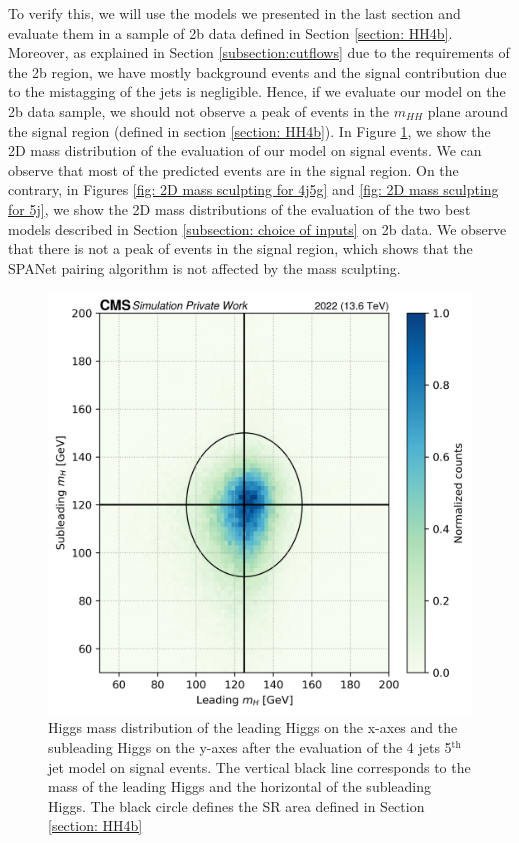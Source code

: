 To verify this, we will use the models we presented in the last section and evaluate them in a sample of 2b data defined in Section \ref{section: HH4b}. Moreover, as explained in Section \ref{subsection:cutflows} due to the requirements of the 2b region, we have mostly background events and the signal contribution due to the mistagging of the jets is negligible. Hence, if we evaluate our model on the 2b data sample, we should not observe a peak of events in the $m_{HH}$ plane around the signal region (defined in section \ref{section: HH4b}). In Figure \ref{fig: 2D mass dist sig}, we show the 2D mass distribution of the evaluation of our model on signal events. We can observe that most of the predicted events are in the signal region. On the contrary, in Figures \ref{fig: 2D mass sculpting for 4j5g} and \ref{fig: 2D mass sculpting for 5j}, we show the 2D mass distributions of the evaluation of the two best models described in Section \ref{subsection: choice of inputs} on 2b data. We observe that there is not a peak of events in the signal region, which shows that the SPANet pairing algorithm is not affected by the mass sculpting. 

\begin{figure}[hbt]
    \centering
    \includegraphics[width=0.6\linewidth]{Images/6.Improving/Mass sculpting/signal mhh.png}
    \caption{Higgs mass distribution of the leading Higgs on the x-axes and the subleading Higgs on the y-axes after the evaluation of the 4 jets 5$^{\text{th}}$ jet model on signal events. The vertical black line corresponds to the mass of the leading Higgs and the horizontal of the subleading Higgs. The black circle defines the SR area defined in Section \ref{section: HH4b}}
    \label{fig: 2D mass dist sig}
\end{figure}


